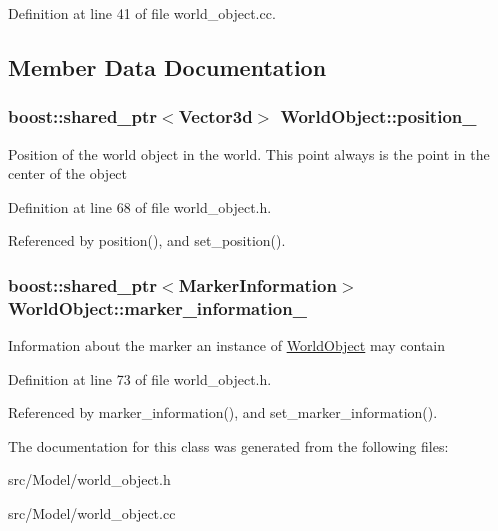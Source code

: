 Definition at line 41 of file world\_\-object.cc.

\subsection{Member Data Documentation}
\hypertarget{class_world_object_f445cb9e3a29647e35064a14ae458b78}{
\subsubsection[position\_\-]{\setlength{\rightskip}{0pt plus 5cm}boost::shared\_\-ptr$<$Vector3d$>$ {\bf WorldObject::position\_\-}}}
\label{class_world_object_f445cb9e3a29647e35064a14ae458b78}


Position of the world object in the world. This point always is the point in the center of the object 

Definition at line 68 of file world\_\-object.h.

Referenced by position(), and set\_\-position().\hypertarget{class_world_object_837a1b5d6014ae2265d8d6f9caf65754}{
\subsubsection[marker\_\-information\_\-]{\setlength{\rightskip}{0pt plus 5cm}boost::shared\_\-ptr$<${\bf MarkerInformation}$>$ {\bf WorldObject::marker\_\-information\_\-}}}
\label{class_world_object_837a1b5d6014ae2265d8d6f9caf65754}


Information about the marker an instance of \hyperlink{class_world_object}{WorldObject} may contain 

Definition at line 73 of file world\_\-object.h.

Referenced by marker\_\-information(), and set\_\-marker\_\-information().

The documentation for this class was generated from the following files:\begin{CompactItemize}
\item 
src/Model/world\_\-object.h\item 
src/Model/world\_\-object.cc\end{CompactItemize}

